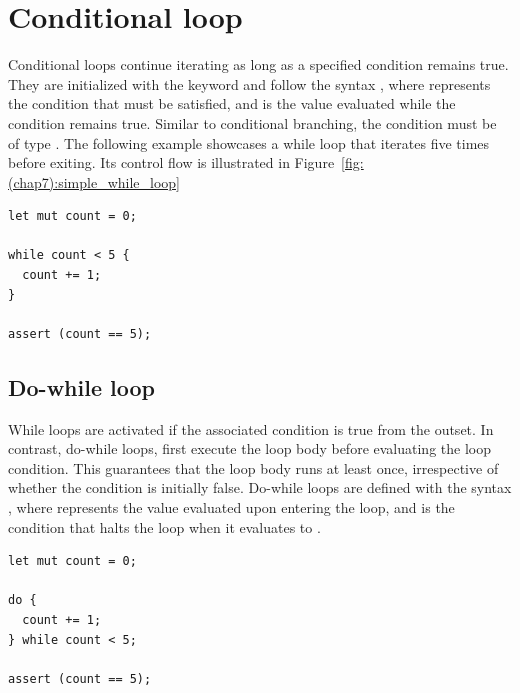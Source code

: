 \section{Conditional loop}%
\label{sec:while_loop}

Conditional loops continue iterating as long as a specified condition remains
true. They are initialized with the keyword  and follow the syntax
, where  represents the condition that must be
satisfied, and  is the value evaluated while the condition remains
true. Similar to conditional branching, the condition  must be of type
. The following example showcases a while loop that iterates five
times before exiting. Its control flow is illustrated in
Figure~\ref{fig:(chap7):simple_while_loop}

\begin{lstlisting}[style=coloredverbatim, caption=Simple while loop, label=lst:(chap7):simple_while_loop]
let mut count = 0;

while count < 5 {
  count += 1;
}

assert (count == 5);
\end{lstlisting}



\subsection{Do-while loop}
\label{sec:do_while_loop}

While loops are activated if the associated condition is true from the outset.
In contrast, do-while loops, first execute the loop body before evaluating the
loop condition. This guarantees that the loop body runs at least once,
irrespective of whether the condition is initially false. Do-while loops are
defined with the syntax , where  represents the
value evaluated upon entering the loop, and  is the condition that
halts the loop when it evaluates to .

\begin{lstlisting}[style=coloredverbatim, caption=Simple do while loop, label=lst:(chap7):simple_do_while_loop]
let mut count = 0;

do {
  count += 1;
} while count < 5;

assert (count == 5);
\end{lstlisting}



